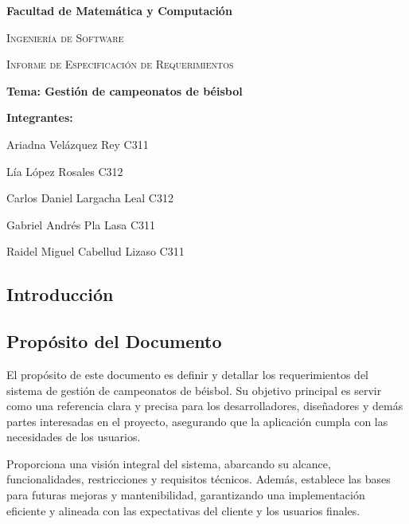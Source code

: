 \documentclass{report}
\begin{document}
    \begin{titlepage}
        \centering
        {\bfseries\LARGE Facultad de Matemática y Computación \par}
        \vspace*{1cm}
        {\scshape\Large Ingeniería de Software \par}
        \vspace*{3cm}
        {\scshape\Huge Informe de Especificación de Requerimientos \par}
        \vspace*{1cm}
        {\LARGE \textbf{Tema: Gestión de campeonatos de béisbol} }
        \vfill
        {\bfseries\LARGE Integrantes: \par}
        {\Large Ariadna Vel\'azquez Rey  C311 \par} 
        {\Large L\'ia L\'opez Rosales  C312 \par} 
        {\Large Carlos Daniel Largacha Leal  C312 \par} 
        {\Large Gabriel Andr\'es Pla Lasa  C311 \par} 
        {\Large Raidel Miguel Cabellud Lizaso C311 \par} 
        \vfill
    \end{titlepage}

    \begin{center}
        \section*{Introducción}
    \end{center}

        \subsection*{Propósito del Documento}
        El propósito de este documento es definir y detallar los requerimientos del sistema de gestión de campeonatos de béisbol. Su objetivo principal es servir como una referencia clara y precisa para los desarrolladores, diseñadores y demás partes interesadas en el proyecto, asegurando que la aplicación cumpla con las necesidades de los usuarios. 

        Proporciona una visión integral del sistema, abarcando su alcance, funcionalidades, restricciones y requisitos técnicos. Además, establece las bases para futuras mejoras y mantenibilidad, garantizando una implementación eficiente y alineada con las expectativas del cliente y los usuarios finales.
\end{document}
